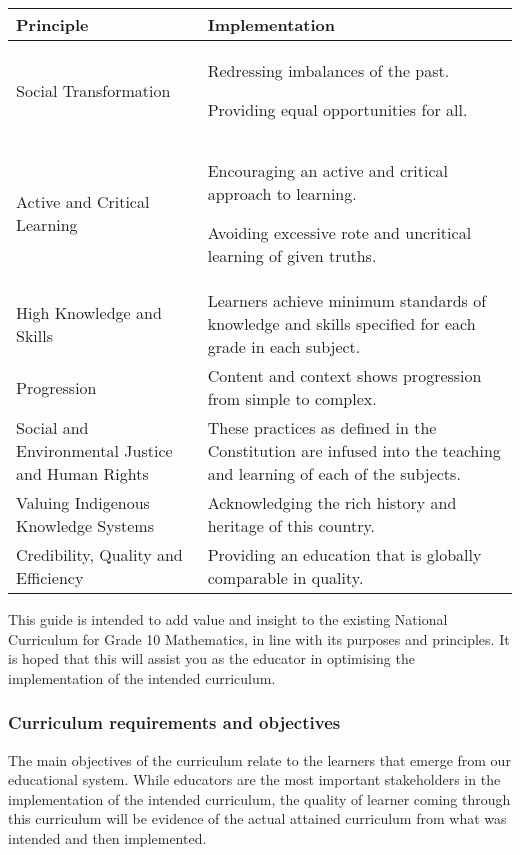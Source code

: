 \begin{table}[H]
\begin{center}
\begin{tabular}{|p{6.5cm}|p{6.5cm}|} \hline
\textbf{Principle} & \textbf{Implementation} \\ \hline
Social Transformation & Redressing imbalances of the past.\par Providing equal opportunities for all.\\ \hline
Active and Critical Learning & Encouraging an active and critical approach to learning. \par Avoiding excessive rote and uncritical learning of given truths.\\ \hline
High Knowledge and Skills & Learners achieve minimum standards of knowledge and skills specified for each grade in each subject. \\ \hline
Progression & Content and context shows progression from simple to complex. \\ \hline
Social and Environmental Justice and Human Rights & These practices as defined in the Constitution are infused into the teaching and learning of each of the subjects. \\ \hline
Valuing Indigenous Knowledge Systems & Acknowledging the rich history and heritage of this country. \\ \hline
Credibility, Quality and Efficiency & Providing an education that is globally comparable in quality. \\ \hline


\end{tabular}
\end{center}
\end{table}

This guide is intended to add value and insight to the existing National Curriculum for Grade 10 Mathematics, in line with its purposes and principles. It is hoped that this will assist you as the educator in optimising the implementation of the intended curriculum. 

\subsubsection{Curriculum requirements and objectives}
The main objectives of the curriculum relate to the learners that emerge from our educational system. While educators are the most important stakeholders in the implementation of the intended curriculum, the quality of learner coming through this curriculum will be evidence of the actual attained curriculum from what was intended and then implemented. \par

